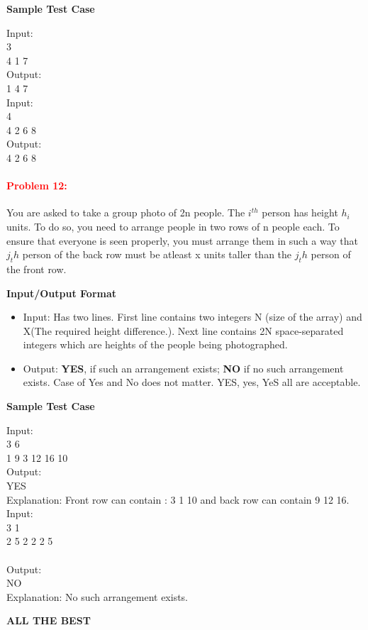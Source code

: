 \documentclass[a4paper,11pt]{article} %
\begin{document}
\textbf{Sample Test Case}

Input: \\ 3 \\ 4 1 7\\
Output:\\ 1 4 7\\

Input: \\ 4 \\ 4 2 6 8 \\
Output:\\ 4 2 6 8 \\

\vspace*{0.3cm}

\paragraph{\textcolor{red}{Problem 12: }}
You are asked to take a group photo of 2n people. The $i^{th}$ person has height $h_i$ units. To do so, you need to arrange people in two rows of n people each. To ensure that everyone is seen properly, you must arrange them in such a way that $j_th$ person of the back row must be atleast  x units taller than the $j_th$ person of the front row.

\textbf{Input/Output Format}
\begin{itemize}
    \item  Input: Has two lines. First line contains two integers N (size of the array) and X(The required height difference.). Next line contains 2N space-separated integers which are heights of the people being photographed.
    \item  Output: \textbf{YES}, if such an arrangement exists; \textbf{NO} if no such arrangement exists. Case of Yes and No does not matter. YES, yes, YeS all are acceptable.
\end{itemize}

\textbf{Sample Test Case}

Input:\\
3 6 \\
1 9 3 12 16 10\\
Output:\\
YES\\

Explanation: Front row can contain : 3 1 10 and back row can contain  9  12 16.\\

Input:\\
3 1\\
2 5 2 2 2 5\\
\\
Output:\\
NO\\

Explanation: No such arrangement exists.


\vspace*{0.3cm}

\begin{center}
    \textbf{ALL THE BEST}
\end{center}
\end{document}
